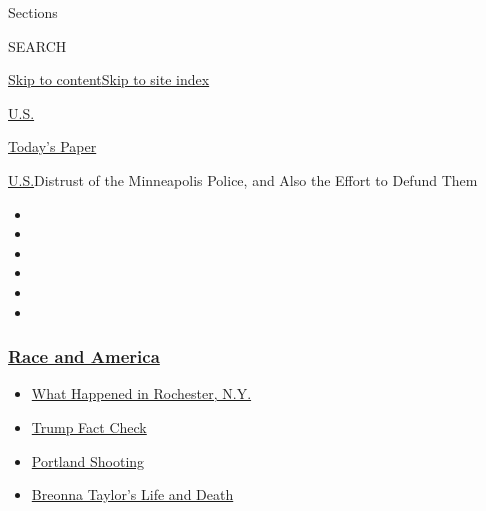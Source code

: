 Sections

SEARCH

\protect\hyperlink{site-content}{Skip to
content}\protect\hyperlink{site-index}{Skip to site index}

\href{https://www.nytimes3xbfgragh.onion/section/us}{U.S.}

\href{https://myaccount.nytimes3xbfgragh.onion/auth/login?response_type=cookie\&client_id=vi}{}

\href{https://www.nytimes3xbfgragh.onion/section/todayspaper}{Today's
Paper}

\href{/section/us}{U.S.}\textbar{}Distrust of the Minneapolis Police,
and Also the Effort to Defund Them

\begin{itemize}
\item
\item
\item
\item
\item
\item
\end{itemize}

\hypertarget{race-and-america}{%
\subsubsection{\texorpdfstring{\href{https://www.nytimes3xbfgragh.onion/news-event/george-floyd-protests-minneapolis-new-york-los-angeles?name=styln-george-floyd\&region=TOP_BANNER\&block=storyline_menu_recirc\&action=click\&pgtype=Article\&impression_id=38371860-f2a2-11ea-985c-b51c0979f06f\&variant=undefined}{Race
and America}}{Race and America}}\label{race-and-america}}

\begin{itemize}
\tightlist
\item
  \href{https://www.nytimes3xbfgragh.onion/2020/09/04/nyregion/rochester-police-daniel-prude.html?name=styln-george-floyd\&region=TOP_BANNER\&block=storyline_menu_recirc\&action=click\&pgtype=Article\&impression_id=38373f70-f2a2-11ea-985c-b51c0979f06f\&variant=undefined}{What
  Happened in Rochester, N.Y.}
\item
  \href{https://www.nytimes3xbfgragh.onion/2020/09/01/us/politics/trump-fact-check-protests.html?name=styln-george-floyd\&region=TOP_BANNER\&block=storyline_menu_recirc\&action=click\&pgtype=Article\&impression_id=38373f71-f2a2-11ea-985c-b51c0979f06f\&variant=undefined}{Trump
  Fact Check}
\item
  \href{https://www.nytimes3xbfgragh.onion/2020/08/30/us/portland-shooting-explained.html?name=styln-george-floyd\&region=TOP_BANNER\&block=storyline_menu_recirc\&action=click\&pgtype=Article\&impression_id=38373f72-f2a2-11ea-985c-b51c0979f06f\&variant=undefined}{Portland
  Shooting}
\item
  \href{https://www.nytimes3xbfgragh.onion/2020/08/30/us/breonna-taylor-police-killing.html?name=styln-george-floyd\&region=TOP_BANNER\&block=storyline_menu_recirc\&action=click\&pgtype=Article\&impression_id=38373f73-f2a2-11ea-985c-b51c0979f06f\&variant=undefined}{Breonna
  Taylor's Life and Death}
\end{itemize}

